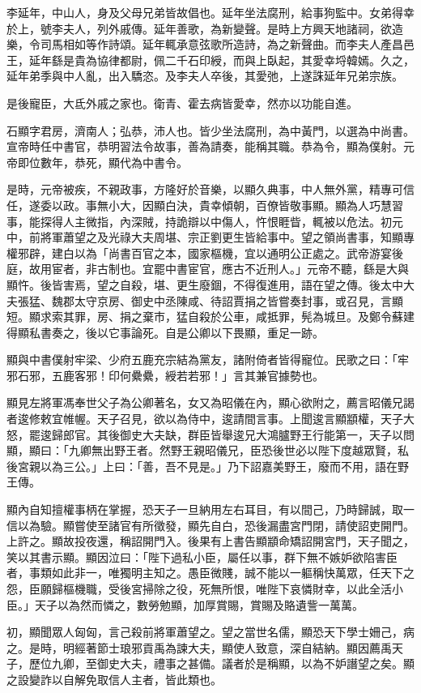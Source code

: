 \begin{pinyinscope}
李延年，中山人，身及父母兄弟皆故倡也。延年坐法腐刑，給事狗監中。女弟得幸於上，號李夫人，列外戚傳。延年善歌，為新變聲。是時上方興天地諸祠，欲造樂，令司馬相如等作詩頌。延年輒承意弦歌所造詩，為之新聲曲。而李夫人產昌邑王，延年繇是貴為協律都尉，佩二千石印綬，而與上臥起，其愛幸埒韓嫣。久之，延年弟季與中人亂，出入驕恣。及李夫人卒後，其愛弛，上遂誅延年兄弟宗族。

是後寵臣，大氐外戚之家也。衛青、霍去病皆愛幸，然亦以功能自進。

石顯字君房，濟南人；弘恭，沛人也。皆少坐法腐刑，為中黃門，以選為中尚書。宣帝時任中書官，恭明習法令故事，善為請奏，能稱其職。恭為令，顯為僕射。元帝即位數年，恭死，顯代為中書令。

是時，元帝被疾，不親政事，方隆好於音樂，以顯久典事，中人無外黨，精專可信任，遂委以政。事無小大，因顯白決，貴幸傾朝，百僚皆敬事顯。顯為人巧慧習事，能探得人主微指，內深賊，持詭辯以中傷人，忤恨睚眥，輒被以危法。初元中，前將軍蕭望之及光祿大夫周堪、宗正劉更生皆給事中。望之領尚書事，知顯專權邪辟，建白以為「尚書百官之本，國家樞機，宜以通明公正處之。武帝游宴後庭，故用宦者，非古制也。宜罷中書宦官，應古不近刑人。」元帝不聽，繇是大與顯忤。後皆害焉，望之自殺，堪、更生廢錮，不得復進用，語在望之傳。後太中大夫張猛、魏郡太守京房、御史中丞陳咸、待詔賈捐之皆嘗奏封事，或召見，言顯短。顯求索其罪，房、捐之棄市，猛自殺於公車，咸抵罪，髡為城旦。及鄭令蘇建得顯私書奏之，後以它事論死。自是公卿以下畏顯，重足一跡。

顯與中書僕射牢梁、少府五鹿充宗結為黨友，諸附倚者皆得寵位。民歌之曰：「牢邪石邪，五鹿客邪！印何纍纍，綬若若邪！」言其兼官據勢也。

顯見左將軍馮奉世父子為公卿著名，女又為昭儀在內，顯心欲附之，薦言昭儀兄謁者逡修敕宜帷幄。天子召見，欲以為侍中，逡請間言事。上聞逡言顯顓權，天子大怒，罷逡歸郎官。其後御史大夫缺，群臣皆舉逡兄大鴻臚野王行能第一，天子以問顯，顯曰：「九卿無出野王者。然野王親昭儀兄，臣恐後世必以陛下度越眾賢，私後宮親以為三公。」上曰：「善，吾不見是。」乃下詔嘉美野王，廢而不用，語在野王傳。

顯內自知擅權事柄在掌握，恐天子一旦納用左右耳目，有以間己，乃時歸誠，取一信以為驗。顯嘗使至諸官有所徵發，顯先自白，恐後漏盡宮門閉，請使詔吏開門。上許之。顯故投夜還，稱詔開門入。後果有上書告顯顓命矯詔開宮門，天子聞之，笑以其書示顯。顯因泣曰：「陛下過私小臣，屬任以事，群下無不嫉妒欲陷害臣者，事類如此非一，唯獨明主知之。愚臣微賤，誠不能以一軀稱快萬眾，任天下之怨，臣願歸樞機職，受後宮掃除之役，死無所恨，唯陛下哀憐財幸，以此全活小臣。」天子以為然而憐之，數勞勉顯，加厚賞賜，賞賜及賂遺訾一萬萬。

初，顯聞眾人匈匈，言己殺前將軍蕭望之。望之當世名儒，顯恐天下學士姍己，病之。是時，明經著節士琅邪貢禹為諫大夫，顯使人致意，深自結納。顯因薦禹天子，歷位九卿，至御史大夫，禮事之甚備。議者於是稱顯，以為不妒譖望之矣。顯之設變詐以自解免取信人主者，皆此類也。


\end{pinyinscope}
